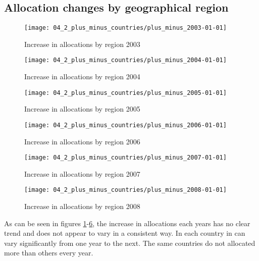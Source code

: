 \subsection{Allocation changes by geographical region}
\begin{figure}[htbp]
 	\centering
 		\texttt{[image: 04\_2\_plus\_minus\_countries/plus\_minus\_2003-01-01]}
	\caption{Increase in allocations by region 2003}
 	\label{fig:increase2003}
\end{figure}
\begin{figure}[htbp]
 	\centering
 		\texttt{[image: 04\_2\_plus\_minus\_countries/plus\_minus\_2004-01-01]}
	\caption{Increase in allocations by region 2004}
 	\label{fig:increase2004}
\end{figure}
\begin{figure}[htbp]
 	\centering
 		\texttt{[image: 04\_2\_plus\_minus\_countries/plus\_minus\_2005-01-01]}
	\caption{Increase in allocations by region 2005}
 	\label{fig:increase2005}
\end{figure}
\begin{figure}[htbp]
 	\centering
 		\texttt{[image: 04\_2\_plus\_minus\_countries/plus\_minus\_2006-01-01]}
	\caption{Increase in allocations by region 2006}
 	\label{fig:increase2006}
\end{figure}
\begin{figure}[htbp]
 	\centering
 		\texttt{[image: 04\_2\_plus\_minus\_countries/plus\_minus\_2007-01-01]}
	\caption{Increase in allocations by region 2007}
 	\label{fig:increase2007}
\end{figure}
\begin{figure}[htbp]
 	\centering
 		\texttt{[image: 04\_2\_plus\_minus\_countries/plus\_minus\_2008-01-01]}
	\caption{Increase in allocations by region 2008}
 	\label{fig:increase2008}
\end{figure}
As can be seen in figures \ref{fig:increase2003}-\ref{fig:increase2008}, the increase in allocations each years has no clear trend and does not appear to vary in a consistent way. In each country in can vary significantly from one year to the next. The same countries do not allocated more than others every year. 